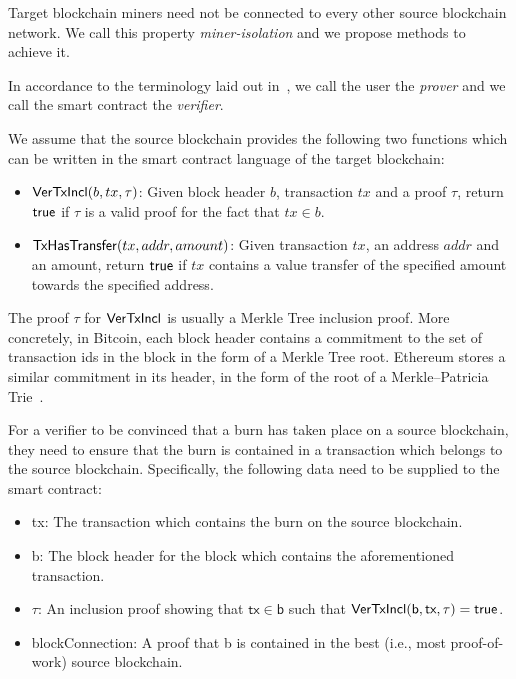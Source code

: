 Target blockchain miners need not be connected to every other source blockchain network. We call this property \emph{miner-isolation} and we propose methods to achieve it.

In accordance to the terminology laid out in~\cite{pow-sidechains}, we call the user the \emph{prover} and we call the smart contract the \emph{verifier}.

We assume that the source blockchain provides the following two functions which can be written in the smart contract language of the target blockchain:

\begin{itemize}
  \item $\mathsf{VerTxIncl}(b, tx, \tau)$: Given block header $b$, transaction $tx$ and a proof $\tau$, return $\mathsf{true}$ if $\tau$ is a valid proof for the fact that $tx \in b$.
  \item $\mathsf{TxHasTransfer}(tx, addr, amount)$: Given transaction $tx$, an address $addr$ and an amount, return $\mathsf{true}$ if $tx$ contains a value transfer of the specified amount towards the specified address.
\end{itemize}

The proof $\tau$ for $\mathsf{VerTxIncl}$ is usually a Merkle Tree inclusion proof. More concretely, in Bitcoin, each block header contains a commitment to the set of transaction ids in the block in the form of a Merkle Tree root. Ethereum stores a similar commitment in its header, in the form of the root of a Merkle--Patricia Trie~\cite{wood2014ethereum}.

For a verifier to be convinced that a burn has taken place on a source blockchain, they need to ensure that the burn is contained in a transaction which belongs to the source blockchain. Specifically, the following data need to be supplied to the smart contract:

\begin{itemize}
  \item \textsf{tx}: The transaction which contains the burn on the source blockchain.
  \item \textsf{b}: The block header for the block which contains the aforementioned transaction.
  \item $\tau$: An inclusion proof showing that $\mathsf{tx} \in \mathsf{b}$ such that $\mathsf{VerTxIncl}(\textsf{b}, \textsf{tx}, \tau) = \mathsf{true}$.
  \item \textsf{blockConnection}: A proof that \textsf{b} is contained in the best (i.e., most proof-of-work) source blockchain.
\end{itemize}

